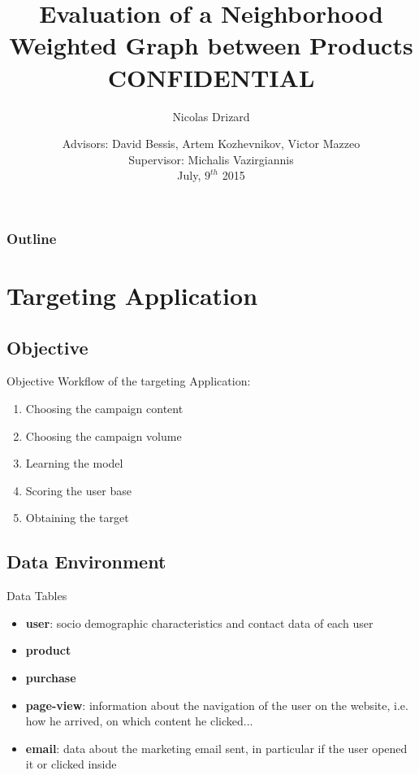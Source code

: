 \documentclass[pdf]{beamer}
\author{Nicolas Drizard}
\date{Advisors: David Bessis, Artem Kozhevnikov, Victor Mazzeo \\ Supervisor: Michalis Vazirgiannis \\ July, $9^{th}$ 2015}
\title{Evaluation of a Neighborhood Weighted Graph between Products \\
$ $   \\
    CONFIDENTIAL}
\begin{document}
\begin{frame}
\titlepage
\end{frame}

\begin{frame}
\frametitle{Outline}
\tableofcontents
\end{frame}


\section{Targeting Application}
\subsection{Objective}

\begin{frame}{Objective}
Workflow of the targeting Application:
\begin{enumerate}
\item{Choosing the campaign content}
\item{Choosing the campaign volume}
\item{Learning the model}
\item{Scoring the user base}
\item{Obtaining the target}
\end{enumerate}
\end{frame}

\subsection{Data Environment}

\begin{frame}{Data Tables}
\begin{itemize}
\item{\textbf{user}: socio demographic characteristics and contact data of each user}
\item{\textbf{product}}
\item{\textbf{purchase}}
\item{\textbf{page-view}: information about the navigation of the user on the website, i.e. how he arrived, on which content he clicked...}
\item{\textbf{email}: data about the marketing email sent, in particular if the user opened it or clicked inside}
\end{itemize}
\end{frame}
\end{document}
